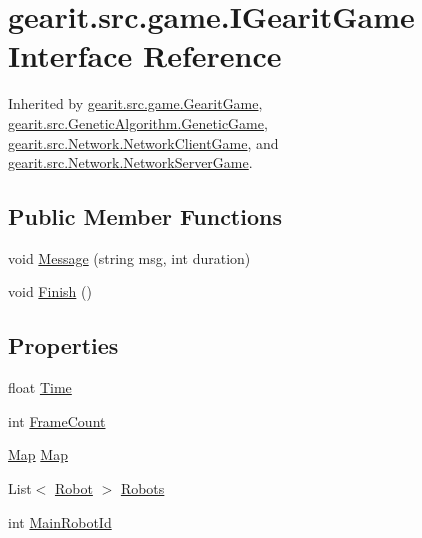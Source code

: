 \hypertarget{interfacegearit_1_1src_1_1game_1_1_i_gearit_game}{\section{gearit.\+src.\+game.\+I\+Gearit\+Game Interface Reference}
\label{interfacegearit_1_1src_1_1game_1_1_i_gearit_game}
}


Inherited by \hyperlink{classgearit_1_1src_1_1game_1_1_gearit_game}{gearit.\+src.\+game.\+Gearit\+Game}, \hyperlink{classgearit_1_1src_1_1_genetic_algorithm_1_1_genetic_game}{gearit.\+src.\+Genetic\+Algorithm.\+Genetic\+Game}, \hyperlink{classgearit_1_1src_1_1_network_1_1_network_client_game}{gearit.\+src.\+Network.\+Network\+Client\+Game}, and \hyperlink{classgearit_1_1src_1_1_network_1_1_network_server_game}{gearit.\+src.\+Network.\+Network\+Server\+Game}.

\subsection*{Public Member Functions}
\begin{DoxyCompactItemize}
\item 
void \hyperlink{interfacegearit_1_1src_1_1game_1_1_i_gearit_game_abbaff2685bf9235fb6a0b7bfadf9df46}{Message} (string msg, int duration)
\item 
void \hyperlink{interfacegearit_1_1src_1_1game_1_1_i_gearit_game_a35e963e32c08963b780a481251e6cdf9}{Finish} ()
\end{DoxyCompactItemize}
\subsection*{Properties}
\begin{DoxyCompactItemize}
\item 
float \hyperlink{interfacegearit_1_1src_1_1game_1_1_i_gearit_game_a9d09c8a74366320d3bd457bd9d2852bc}{Time}
\item 
int \hyperlink{interfacegearit_1_1src_1_1game_1_1_i_gearit_game_afeb5f63499a46d00260ba9e21fc125f0}{Frame\+Count}
\item 
\hyperlink{classgearit_1_1src_1_1map_1_1_map}{Map} \hyperlink{interfacegearit_1_1src_1_1game_1_1_i_gearit_game_a59467a9b27f608b24f38c2dce7424722}{Map}
\item 
List$<$ \hyperlink{classgearit_1_1src_1_1robot_1_1_robot}{Robot} $>$ \hyperlink{interfacegearit_1_1src_1_1game_1_1_i_gearit_game_a52f47e836daf8245f23d699446f75e54}{Robots}
\item 
int \hyperlink{interfacegearit_1_1src_1_1game_1_1_i_gearit_game_a42d42208ffca22ea2acf221511010796}{Main\+Robot\+Id}
\end{DoxyCompactItemize}


